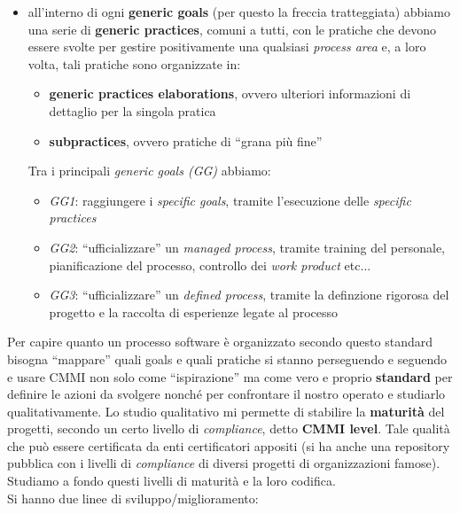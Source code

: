 \documentclass[a4paper,12pt, oneside]{book}
\begin{document}
\begin{itemize}
\begin{itemize}
  \end{itemize}
  \item all'interno di ogni \textbf{generic goals} (per questo la freccia
  tratteggiata) abbiamo una serie di \textbf{generic practices}, comuni a tutti,
  con le pratiche che devono essere svolte per gestire positivamente una
  qualsiasi \textit{process area} e, a loro volta, tali pratiche sono
  organizzate in:
  \begin{itemize}
    \item \textbf{generic practices elaborations}, ovvero ulteriori informazioni
    di dettaglio per la singola pratica
    \item \textbf{subpractices}, ovvero pratiche di ``grana più fine''
  \end{itemize}
  Tra i principali \textit{generic goals (GG)} abbiamo:
  \begin{itemize}
    \item \textit{GG1}: raggiungere i \textit{specific goals}, tramite
    l'esecuzione delle \textit{specific practices}
    \item \textit{GG2}: ``ufficializzare'' un \textit{managed process}, tramite
    training del personale, pianificazione del processo, controllo dei
    \textit{work product} etc$\ldots$
    \item \textit{GG3}:  ``ufficializzare'' un \textit{defined process}, tramite
    la definzione rigorosa del progetto e la raccolta di esperienze legate al
    processo
  \end{itemize}
\end{itemize}
Per capire quanto un processo software è organizzato secondo questo standard
bisogna ``mappare'' quali goals e quali pratiche si stanno perseguendo e
seguendo e usare CMMI non solo come ``ispirazione'' ma come vero e proprio
\textbf{standard} per definire le azioni da svolgere nonché per confrontare il
nostro operato e studiarlo qualitativamente. Lo studio qualitativo mi permette
di stabilire la \textbf{maturità} del progetti, secondo un certo livello di
\textit{compliance}, detto \textbf{CMMI level}. Tale qualità che può essere 
certificata da enti certificatori appositi (si ha anche una repository pubblica
con i livelli di \textit{compliance} di diversi progetti di organizzazioni
famose).\\
Studiamo a fondo questi livelli di maturità e la loro codifica.\\
Si hanno due linee di sviluppo/miglioramento:
\end{document}
